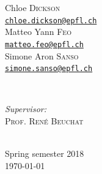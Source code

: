\begin{titlepage}
\begin{minipage}{0.4\textwidth}
\begin{flushleft}
\large Chloe \textsc{Dickson} \\ \texttt{\href{mailto:chloe.dickson@epfl.ch}{chloe.dickson@epfl.ch}} \\ \vspace{3mm}
\large Matteo Yann \textsc{Feo} \\   \texttt{\href{mailto:matteo.feo@epfl.ch}{matteo.feo@epfl.ch}} \\ \vspace{3mm}
\large Simone Aron \textsc{Sanso} \\ \texttt{\href{mailto:simone.sanso@epfl.ch}{simone.sanso@epfl.ch}}
 






\end{flushleft}
\end{minipage}
~
\begin{minipage}{0.4\textwidth}
\begin{flushright} \large
\emph{Supervisor:} \\
\textsc{Prof. René Beuchat} %
\end{flushright}
\end{minipage}\\[1.5cm]



{\large Spring semester 2018\\\vspace{3mm}\today}\\[0.9cm] %


\vfill


\end{titlepage}

